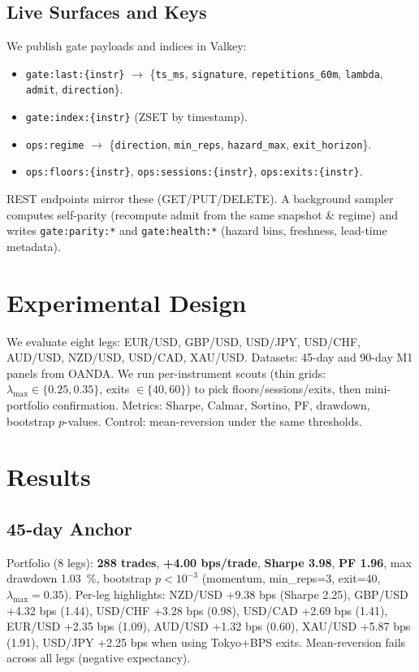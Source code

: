 \documentclass[11pt]{article}
\begin{document}
\subsection{Live Surfaces and Keys}
We publish gate payloads and indices in Valkey:
\begin{itemize}[leftmargin=1.5em]
\item \texttt{gate:last:\{instr\}} $\rightarrow$ \{\texttt{ts\_ms}, \texttt{signature}, \texttt{repetitions\_60m}, \texttt{lambda}, \texttt{admit}, \texttt{direction}\}.
\item \texttt{gate:index:\{instr\}} (ZSET by timestamp).
\item \texttt{ops:regime} $\rightarrow$ \{\texttt{direction}, \texttt{min\_reps}, \texttt{hazard\_max}, \texttt{exit\_horizon}\}.
\item \texttt{ops:floors:\{instr\}}, \texttt{ops:sessions:\{instr\}}, \texttt{ops:exits:\{instr\}}.
\end{itemize}
REST endpoints mirror these (GET/PUT/DELETE). A background sampler computes self-parity (recompute admit from
the same snapshot \& regime) and writes \texttt{gate:parity:*} and \texttt{gate:health:*} (hazard bins, freshness, lead-time metadata).

\section{Experimental Design}
We evaluate eight legs: EUR/USD, GBP/USD, USD/JPY, USD/CHF, AUD/USD, NZD/USD, USD/CAD, XAU/USD.
Datasets: 45-day and 90-day M1 panels from OANDA. We run per-instrument scouts (thin grids:
$\lambda_{\max}\in\{0.25,0.35\}$, exits $\in\{40,60\}$) to pick floors/sessions/exits, then mini-portfolio
confirmation. Metrics: Sharpe, Calmar, Sortino, PF, drawdown, bootstrap $p$-values. Control: mean-reversion under the
same thresholds.

\section{Results}
\subsection{45-day Anchor}
Portfolio (8 legs): \textbf{288 trades}, \textbf{+4.00 bps/trade}, \textbf{Sharpe 3.98}, \textbf{PF 1.96},
max drawdown \SI{1.03}{\percent}, bootstrap $p<10^{-3}$ (momentum, min\_reps=3, exit=40, $\lambda_{\max}=0.35$).
Per-leg highlights: NZD/USD +9.38 bps (Sharpe 2.25), GBP/USD +4.32 bps (1.44), USD/CHF +3.28 bps (0.98),
USD/CAD +2.69 bps (1.41), EUR/USD +2.35 bps (1.09), AUD/USD +1.32 bps (0.60), XAU/USD +5.87 bps (1.91),
USD/JPY +2.25 bps when using Tokyo+BPS exits. Mean-reversion fails across all legs (negative expectancy).
\end{document}
